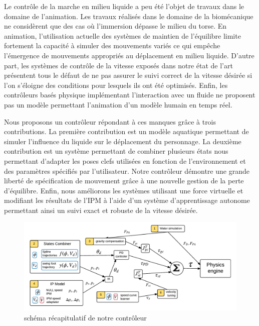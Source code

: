 \documentclass[runningheads,a4paper]{llncs}
\begin{document}
Le contrôle de la marche en milieu liquide a peu été l'objet de travaux dans le domaine de l'animation.  Les travaux réalisés dans le domaine de la biomécanique ne considèrent que des cas où l'immersion dépasse le milieu du torse. En animation, l'utilisation actuelle des systèmes de maintien de l'équilibre limite fortement la capacité à simuler des mouvements variés ce qui empêche l'émergence de mouvements appropriés au déplacement en milieu liquide. D'autre part, les systèmes de contrôle de la vitesse exposés dans notre état de l'art présentent tous  le défaut de ne pas assurer le suivi correct de la vitesse désirée si l'on s'éloigne des conditions pour lesquels ils ont été optimisés. Enfin, les contrôleurs basés physique implémentant l'interaction avec un fluide ne proposent pas un modèle permettant l'animation d'un modèle humain en temps réel.

Nous proposons un contrôleur répondant à ces manques grâce à trois contributions. La première contribution est un modèle aquatique permettant de simuler l'influence du liquide sur le déplacement du personnage. La deuxième contribution est un système permettant de combiner plusieurs états nous permettant d'adapter les poses clefs utilisées en fonction de l'environnement et des paramètres spécifiés par l'utilisateur. Notre contrôleur démontre une grande liberté de spécification de mouvement grâce à une nouvelle gestion de la perte d'équilibre. Enfin, nous améliorons les systèmes utilisant une force virtuelle et modifiant les résultats de l'IPM à l'aide d'un système d'apprentissage autonome permettant ainsi un suivi exact et robuste de la vitesse désirée. 

\vspace*{-0.5cm}
\begin{figure}[h]
\centering
\includegraphics[scale=0.6]{general_process.pdf}
\caption{schéma récapitulatif de notre contrôleur}
\label{fig:shema_controler}
\end{figure}
\end{document}
